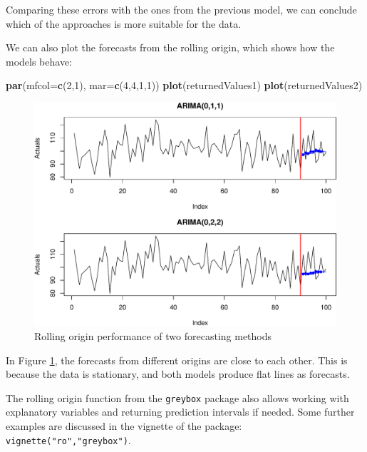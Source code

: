 \documentclass[]{book}
\newenvironment{Shaded}{\begin{snugshade}}{\end{snugshade}}
\newcommand{\DataTypeTok}[1]{\textcolor[rgb]{0.13,0.29,0.53}{#1}}
\newcommand{\DecValTok}[1]{\textcolor[rgb]{0.00,0.00,0.81}{#1}}
\newcommand{\KeywordTok}[1]{\textcolor[rgb]{0.13,0.29,0.53}{\textbf{#1}}}
\newcommand{\NormalTok}[1]{#1}
\theoremstyle{definition}
\theoremstyle{definition}
\theoremstyle{definition}
\theoremstyle{definition}
\theoremstyle{remark}
\begin{document}
Comparing these errors with the ones from the previous model, we can conclude which of the approaches is more suitable for the data.

We can also plot the forecasts from the rolling origin, which shows how the models behave:

\begin{Shaded}
\begin{Highlighting}[]
\KeywordTok{par}\NormalTok{(}\DataTypeTok{mfcol=}\KeywordTok{c}\NormalTok{(}\DecValTok{2}\NormalTok{,}\DecValTok{1}\NormalTok{), }\DataTypeTok{mar=}\KeywordTok{c}\NormalTok{(}\DecValTok{4}\NormalTok{,}\DecValTok{4}\NormalTok{,}\DecValTok{1}\NormalTok{,}\DecValTok{1}\NormalTok{))}
\KeywordTok{plot}\NormalTok{(returnedValues1)}
\KeywordTok{plot}\NormalTok{(returnedValues2)}
\end{Highlighting}
\end{Shaded}

\begin{figure}
\centering
\includegraphics{Svetunkov--2022----ADAM_files/figure-latex/roExample01-1.pdf}
\caption{\label{fig:roExample01}Rolling origin performance of two forecasting methods}
\end{figure}

In Figure \ref{fig:roExample01}, the forecasts from different origins are close to each other. This is because the data is stationary, and both models produce flat lines as forecasts.

The rolling origin function from the \texttt{greybox} package also allows working with explanatory variables and returning prediction intervals if needed. Some further examples are discussed in the vignette of the package: \texttt{vignette("ro","greybox")}.
\end{document}

